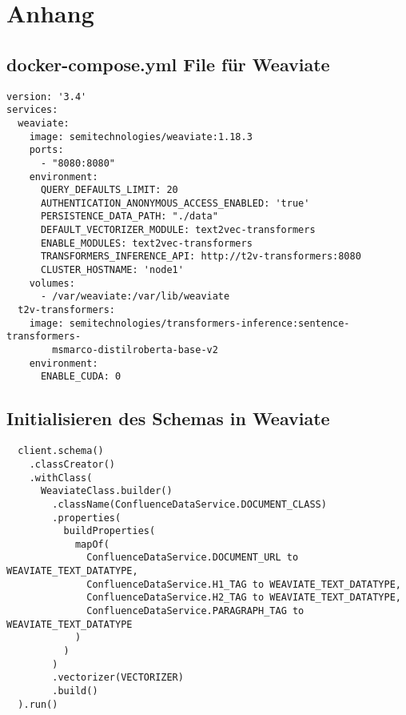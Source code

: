 \chapter{Anhang}
\label{chap:appendix}

\section{docker-compose.yml File für Weaviate}
\begin{verbatim}
version: '3.4'
services:
  weaviate:
    image: semitechnologies/weaviate:1.18.3
    ports:
      - "8080:8080"
    environment:
      QUERY_DEFAULTS_LIMIT: 20
      AUTHENTICATION_ANONYMOUS_ACCESS_ENABLED: 'true'
      PERSISTENCE_DATA_PATH: "./data"
      DEFAULT_VECTORIZER_MODULE: text2vec-transformers
      ENABLE_MODULES: text2vec-transformers
      TRANSFORMERS_INFERENCE_API: http://t2v-transformers:8080
      CLUSTER_HOSTNAME: 'node1'
    volumes:
      - /var/weaviate:/var/lib/weaviate
  t2v-transformers:
    image: semitechnologies/transformers-inference:sentence-transformers-
        msmarco-distilroberta-base-v2
    environment:
      ENABLE_CUDA: 0
\end{verbatim}

\section{Initialisieren des Schemas in Weaviate}
\begin{verbatim}
  client.schema()
    .classCreator()
    .withClass(
      WeaviateClass.builder()
        .className(ConfluenceDataService.DOCUMENT_CLASS)
        .properties(
          buildProperties(
            mapOf(
              ConfluenceDataService.DOCUMENT_URL to WEAVIATE_TEXT_DATATYPE,
              ConfluenceDataService.H1_TAG to WEAVIATE_TEXT_DATATYPE,
              ConfluenceDataService.H2_TAG to WEAVIATE_TEXT_DATATYPE,
              ConfluenceDataService.PARAGRAPH_TAG to WEAVIATE_TEXT_DATATYPE
            )
          )
        )
        .vectorizer(VECTORIZER)
        .build()
  ).run()
\end{verbatim}